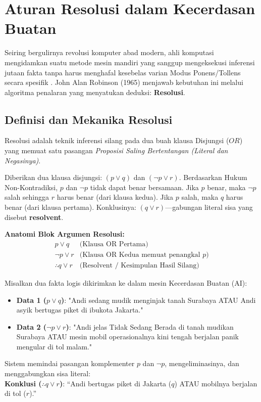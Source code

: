 \section{Aturan Resolusi dalam Kecerdasan Buatan}

Seiring bergulirnya revolusi komputer abad modern, ahli komputasi mengidamkan suatu metode mesin mandiri yang sanggup mengeksekusi inferensi jutaan fakta tanpa harus menghafal kesebelas varian Modus Ponens/Tollens secara spesifik \cite{rosen2019,iep_natded}. John Alan Robinson (1965) menjawab kebutuhan ini melalui algoritma penalaran yang menyatukan deduksi: \textbf{Resolusi}.

\subsection{Definisi dan Mekanika Resolusi}

Resolusi adalah teknik inferensi silang pada dua buah klausa Disjungsi ($OR$) yang memuat satu pasangan \textit{Proposisi Saling Bertentangan (Literal dan Negasinya)}.

\begin{teorema}
Diberikan dua klausa disjungsi: $(p \lor q)$ dan $(\neg p \lor r)$. Berdasarkan Hukum Non-Kontradiksi, $p$ dan $\neg p$ tidak dapat benar bersamaan. Jika $p$ benar, maka $\neg p$ salah sehingga $r$ harus benar (dari klausa kedua). Jika $p$ salah, maka $q$ harus benar (dari klausa pertama). Konklusinya: $(q \lor r)$---gabungan literal sisa yang disebut \textbf{resolvent}.
\end{teorema}

\textbf{Anatomi Blok Argumen Resolusi:}
\[
\begin{array}{cl}
p \vee q & \text{(Klausa OR Pertama)} \\
\neg p \vee r & \text{(Klausa OR Kedua memuat penangkal } p) \\
\hline
\therefore q \vee r & \text{(Resolvent / Kesimpulan Hasil Silang)}
\end{array}
\]

\begin{contoh}
Misalkan dua fakta logis dikirimkan ke dalam mesin Kecerdasan Buatan (AI):
\begin{itemize}
    \item \textbf{Data 1 ($p \lor q$)}: "Andi sedang mudik menginjak tanah Surabaya ATAU Andi asyik bertugas piket di ibukota Jakarta."
    \item \textbf{Data 2 ($\neg p \lor r$)}: "Andi jelas Tidak Sedang Berada di tanah mudikan Surabaya ATAU mesin mobil operasionalnya kini tengah berjalan panik mengular di tol malam."
\end{itemize}
Sistem memindai pasangan komplementer $p$ dan $\neg p$, mengeliminasinya, dan menggabungkan sisa literal: \\
\textbf{Konklusi ($\therefore q \lor r$)}: ``Andi bertugas piket di Jakarta ($q$) ATAU mobilnya berjalan di tol ($r$).''
\end{contoh}

